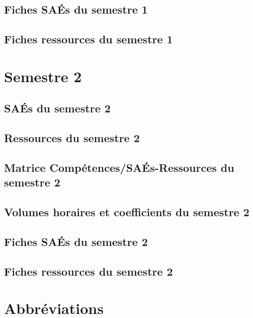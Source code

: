 \documentclass[10pt,lualatex,french]{article}
\begin{document}


\newpage

\subsection{Fiches SAÉs du semestre 1}
\affichageSAE{\sem}
\newpage

\subsection{Fiches ressources du semestre 1}
\affichageRessource{\sem}

\section{Semestre 2}
\def\sem{B} %

\subsection{SAÉs du semestre 2}

\listeTitreSAE{\sem}

\subsection{Ressources du semestre 2}

\listeTitreRessourceIndex{\sem} 

\subsection{Matrice Compétences/SAÉs-Ressources du semestre 2}

\scalebox{0.95}{}

\subsection{Volumes horaires et coefficients du semestre 2}



\newpage

\subsection{Fiches SAÉs du semestre 2}
\affichageSAE{\sem}

\subsection{Fiches ressources du semestre 2}
\affichageRessource{\sem}

\section{Abbréviations}

\begin{multicols}{2}\small

\end{multicols}
\end{document}
